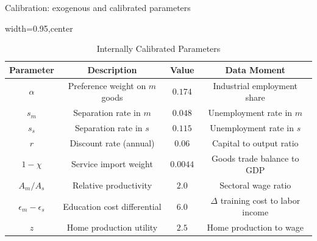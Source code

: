 \documentclass[9pt,xcolor={svgnames}]{beamer}
\begin{document}
\begin{frame}{Calibration: exogenous and calibrated parameters}
\begin{table}[h!]
\centering
\caption{Internally Calibrated Parameters}
\label{table_calibrated_parameters_slides}
\begin{adjustbox}{width=0.95\columnwidth,center}
\begin{tabular}{||c c c c||}\hline
\textbf{Parameter} & \textbf{Description} & \textbf{Value} & \textbf{Data Moment} \\\hline\hline
$\alpha$ & Preference weight on $m$ goods & $0.174$ & Industrial employment share \\
$s_m$ & Separation rate in $m$ & $0.048$ & Unemployment rate in $m$ \\
$s_s$ & Separation rate in $s$ & $0.115$ & Unemployment rate in $s$ \\
$r$ & Discount rate (annual) & $0.06$ & Capital to output ratio \\
$1-\chi$ & Service import weight & $0.0044$ & Goods trade balance to GDP \\
$A_m/A_s$ & Relative productivity & $2.0$ & Sectoral wage ratio \\
$\epsilon_m-\epsilon_s$ & Education cost differential & $6.0$ & $\Delta$ training cost to labor income \\
$z$ & Home production utility & $2.5$ & Home production to wage \\
\hline
\end{tabular}
\end{adjustbox}
\end{table}

\end{frame}


\end{document}
